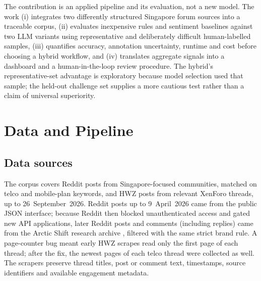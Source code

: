 \documentclass[11pt,a4paper]{article}
\begin{document}
The contribution is an applied pipeline and its evaluation, not a new model. The work (i) integrates two differently structured Singapore forum sources into a traceable corpus, (ii) evaluates inexpensive rules and sentiment baselines against two LLM variants using representative and deliberately difficult human-labelled samples, (iii) quantifies accuracy, annotation uncertainty, runtime and cost before choosing a hybrid workflow, and (iv) translates aggregate signals into a dashboard and a human-in-the-loop review procedure. The hybrid's representative-set advantage is exploratory because model selection used that sample; the held-out challenge set supplies a more cautious test rather than a claim of universal superiority.

\section{Data and Pipeline}

\subsection{Data sources}

The corpus covers Reddit posts from Singapore-focused communities, matched on telco and mobile-plan keywords, and HWZ posts from relevant XenForo threads, up to 26~September~2026. Reddit posts up to 9~April~2026 came from the public JSON interface; because Reddit then blocked unauthenticated access and gated new API applications, later Reddit posts and comments (including replies) came from the Arctic Shift research archive \cite{arcticshift}, filtered with the same strict brand rule. A page-counter bug meant early HWZ scrapes read only the first page of each thread; after the fix, the newest pages of each telco thread were collected as well. The scrapers preserve thread titles, post or comment text, timestamps, source identifiers and available engagement metadata.
\end{document}
